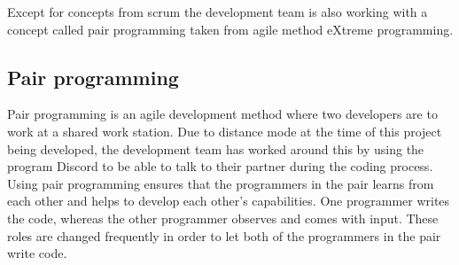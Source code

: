 Except for concepts from scrum the development team is also working with a concept called pair programming taken from agile method eXtreme programming. 

\subsection{Pair programming}
Pair programming is an agile development method where two developers are to work at a shared work station. Due to distance mode at the time of this project being developed, the development team has worked around this by using the program Discord to be able to talk to their partner during the coding process. Using pair programming ensures that the programmers in the pair learns from each other and helps to develop each other's capabilities. One programmer writes the code, whereas the other programmer observes and comes with input. These roles are changed frequently in order to let both of the programmers in the pair write code. 